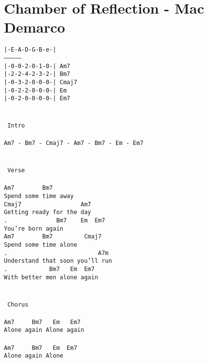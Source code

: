 \newpage
\section{Chamber of Reflection - Mac Demarco}
\label{Chamber of Reflection - Mac Demarco}
\texttt{|-E-A-D-G-B-e-|\\
---------------\\
|-0-0-2-0-1-0-|  Am7\ \\
|-2-2-4-2-3-2-|  Bm7\ \\
|-0-3-2-0-0-0-|  Cmaj7\ \ \\
|-0-2-2-0-0-0-|  Em\ \ \\
|-0-2-0-0-0-0-|  Em7\ \\
\\
\\
\lbrack\ Intro\rbrack\\
\\
Am7\ -\ Bm7\ -\ Cmaj7\ -\ Am7\ -\ Bm7\ -\ Em\ -\ Em7\\
\\
\\
\lbrack\ Verse\rbrack\\
\\
Am7\ \ \ \ \ \ \ \ Bm7\ \ \\
Spend\ some\ time\ away\\
Cmaj7\ \ \ \ \ \ \ \ \ \ \ \ \ \ \ \ \ Am7\ \ \\
Getting\ ready\ for\ the\ day\\
.\ \ \ \ \ \ \ \ \ \ \ \ \ \ Bm7\ \ \ \ Em\ \ Em7\\
You're\ born\ again\\
Am7\ \ \ \ \ \ \ \ Bm7\ \ \ \ \ \ \ \ \ Cmaj7\\
Spend\ some\ time\ alone\\
.\ \ \ \ \ \ \ \ \ \ \ \ \ \ \ \ \ \ \ \ \ \ \ \ \ \ A7m\\
Understand\ that\ soon\ you'll\ run\\
.\ \ \ \ \ \ \ \ \ \ \ \ Bm7\ \ \ Em\ \ Em7\\
With\ better\ men\ alone\ again\\
\\
\\
\lbrack\ Chorus\rbrack\ \\
\\
Am7\ \ \ \ \ Bm7\ \ \ Em\ \ \ Em7\\
Alone\ again\ Alone\ again\\
\\
Am7\ \ \ \ \ Bm7\ \ \ Em\ \ Em7\\
Alone\ again\ Alone\\
}
